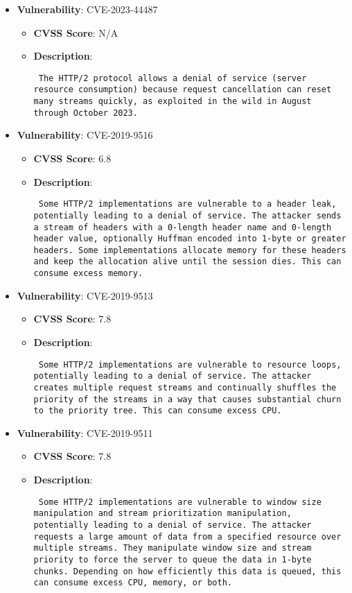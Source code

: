 \documentclass{article}
\begin{document}
\begin{itemize}
    
        \item \textbf{Vulnerability}: CVE-2023-44487
        \begin{itemize}
            \item \textbf{CVSS Score}:  N/A 
            \item \textbf{Description}: \parbox{\linewidth}{\texttt{ The HTTP/2 protocol allows a denial of service (server resource consumption) because request cancellation can reset many streams quickly, as exploited in the wild in August through October 2023. }}
        \end{itemize}
    
        \item \textbf{Vulnerability}: CVE-2019-9516
        \begin{itemize}
            \item \textbf{CVSS Score}:  6.8 
            \item \textbf{Description}: \parbox{\linewidth}{\texttt{ Some HTTP/2 implementations are vulnerable to a header leak, potentially leading to a denial of service. The attacker sends a stream of headers with a 0-length header name and 0-length header value, optionally Huffman encoded into 1-byte or greater headers. Some implementations allocate memory for these headers and keep the allocation alive until the session dies. This can consume excess memory. }}
        \end{itemize}
    
        \item \textbf{Vulnerability}: CVE-2019-9513
        \begin{itemize}
            \item \textbf{CVSS Score}:  7.8 
            \item \textbf{Description}: \parbox{\linewidth}{\texttt{ Some HTTP/2 implementations are vulnerable to resource loops, potentially leading to a denial of service. The attacker creates multiple request streams and continually shuffles the priority of the streams in a way that causes substantial churn to the priority tree. This can consume excess CPU. }}
        \end{itemize}
    
        \item \textbf{Vulnerability}: CVE-2019-9511
        \begin{itemize}
            \item \textbf{CVSS Score}:  7.8 
            \item \textbf{Description}: \parbox{\linewidth}{\texttt{ Some HTTP/2 implementations are vulnerable to window size manipulation and stream prioritization manipulation, potentially leading to a denial of service. The attacker requests a large amount of data from a specified resource over multiple streams. They manipulate window size and stream priority to force the server to queue the data in 1-byte chunks. Depending on how efficiently this data is queued, this can consume excess CPU, memory, or both. }}
        \end{itemize}
    

\end{itemize}
\end{document}
